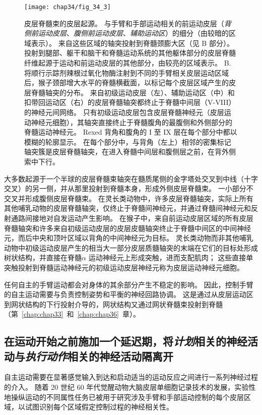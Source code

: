 \begin{figure}[htbp]
	\centering
	\texttt{[image: chap34/fig\_34\_3]}
	\caption{皮层脊髓束的皮层起源。 
		与手臂和手部运动相关的前运动皮层（\textit{背侧前运动皮层}、\textit{腹侧前运动皮层}、\textit{辅助运动区}）的细分（由较暗的区域表示）。
		来自这些区域的轴突投射到脊髓颈膨大区（见 B 部分）。
		投射到腿部、躯干和脑干和脊髓运动系统的其他躯体部分的皮层脊髓纤维起源于运动和前运动皮层的其他部分，由较亮的区域表示。 
		B. 将顺行示踪剂辣根过氧化物酶注射到不同的手臂相关皮层运动区域后，猴子颈部增大水平的脊髓横截面，以标记每个皮层区域产生的皮层脊髓轴突的分布。
		来自初级运动皮层（左）、辅助运动区（中）和扣带回运动区（右）的皮层脊髓轴突都终止于脊髓中间层（V-VIII）的神经元间网络。
		只有初级运动皮层包含皮层脊髓神经元（皮层运动神经元细胞），其轴突直接终止于脊髓腹角的最腹侧和外侧部分的脊髓运动神经元。
		Rexed 背角和腹角的 I 至 IX 层在每个部分中都以模糊的轮廓显示。
		在每个部分中，与背角（左上）相邻的密集标记轴突簇是皮层脊髓轴突，在进入脊髓中间层和腹侧层之前，在背外侧索中下行。}
	\label{fig:34_3}
\end{figure}


大多数起源于一个半球的皮层脊髓束轴突在髓质尾侧的金字塔处交叉到中线（十字交叉）的另一侧，并从那里投射到脊髓本身，形成外侧皮层脊髓束。
一小部分不交叉并形成腹侧皮层脊髓束。
在灵长类动物中，许多皮层脊髓轴突，实际上所有其他哺乳动物的皮层脊髓轴突，仅终止于脊髓间神经元，并通过脊髓间神经元和反射通路间接地对自发运动产生影响。
在猴子中，来自前运动皮层区域的所有皮层脊髓轴突和许多来自初级运动皮层的皮层皮髓轴突终止于脊髓中间区的中间神经元，而后中央和顶叶区域以背角的中间神经元为目标。
灵长类动物而非其他哺乳动物中初级运动皮层产生的相当大一部分皮层质髓轴突的末端在它们的目标处形成树状结构，并直接在脊髓$ \alpha $ 运动神经元上形成突触，进而支配肌肉；
这些直接单突触投射到脊髓运动神经元的初级运动皮层神经元称为皮层运动神经元细胞。


任何自主的手臂运动都会对身体的其余部分产生不稳定的影响。
因此，控制手臂的自主运动需要与负责控制姿势和平衡的神经回路协调。
这是通过从皮层运动区到网状结构的下行投射介导的，网状结构又通过网状脊髓束投射到脊髓（第~\ref{chap:chap33}~和~\ref{chap:chap36}~章）。



\subsection{在运动开始之前施加一个延迟期，将\textit{计划}相关的神经活动与\textit{执行动作}相关的神经活动隔离开}


自主运动需要在显著感觉输入到达和启动适当的运动反应之间进行一系列神经过程的介入。
随着 20 世纪 60 年代觉醒动物大脑皮层单细胞记录技术的发展，实验性地操纵运动的不同属性任务已被用于研究涉及手臂和手部运动控制的每个皮层区域，以试图识别每个区域假定控制过程的神经相关性。


